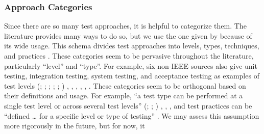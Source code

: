 
\subsubsection{Approach Categories}\label{cats-def}

Since there are so many test approaches, it is helpful to categorize them.
The literature provides many ways to do so, but we use the one given by
\ifnotpaper\else \citeauthor{IEEE2022} \fi \citet{IEEE2022} because of its wide usage.
This schema divides test approaches into levels, types, techniques, and practices
\citeyearpar[Fig.~2; see ]{IEEE2022}. These categories seem
to be pervasive throughout the literature, particularly ``level'' and ``type''.
\label{nonIEEE-sources}%
For example, six non-IEEE sources also give unit testing, integration testing,
system testing, and acceptance testing as examples of test levels \ifnotpaper
    (\citealp[pp.~5\=/6 to 5\=/7]{SWEBOK2024}; \citealpISTQB{};
    \citealp[pp.~807\==808]{Perry2006}; \citealp[pp.~443\==445]{PetersAndPedrycz2000};
    \citealp[p.~218]{KuļešovsEtAl2013};
    \citealp[pp.~9, 13]{Gerrard2000a})\else
    \cite[pp.~443\==445]{PetersAndPedrycz2000},
    \cite[pp.~5\=/6 to 5\=/7]{SWEBOK2024}, \cite{ISTQB},
    \cite[pp.~807\==808]{Perry2006}, \cite[pp.~9, 13]{Gerrard2000a},
    \cite[p.~218]{KuļešovsEtAl2013}\fi.\label{orth-approach}
These categories seem to be orthogonal based on their definitions and usage.
For example, ``a test type can be performed at a single test level or across
several test levels'' \ifnotpaper (\citealp[p.~15]{IEEE2022};
    \citeyear[p.~8]{IEEE2021a}; \citeyear[p.~7]{IEEE2021c})\else
    \cite[p.~15]{IEEE2022}, \cite[p.~7]{IEEE2021c}, \cite[p.~8]{IEEE2021a}\fi,
and test practices can be ``defined \dots{} for a specific level or type of
testing'' \citeyearpar[p.~9]{IEEE2021b}.
We may assess this assumption more rigorously in the future, but for now, it
